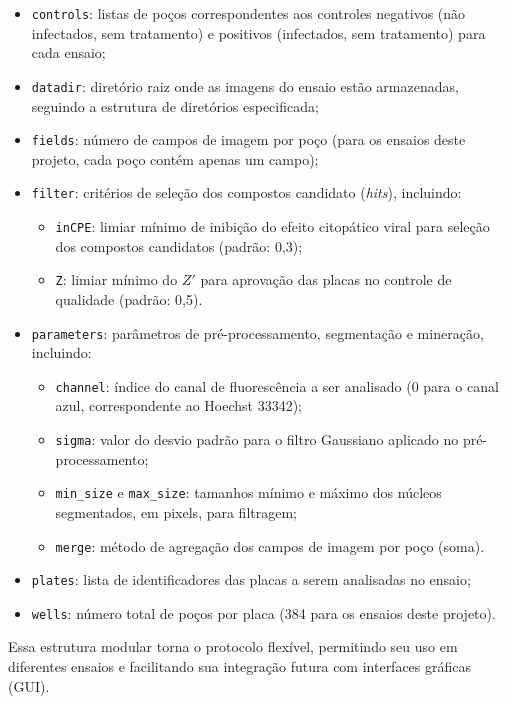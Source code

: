 \documentclass[12pt]{article}
\begin{document}
\begin{itemize}
  \item \texttt{controls}: listas de poços correspondentes aos controles negativos (não infectados, sem tratamento) e positivos (infectados, sem tratamento) para cada ensaio;
  \item \texttt{datadir}: diretório raiz onde as imagens do ensaio estão armazenadas, seguindo a estrutura de diretórios especificada;
  \item \texttt{fields}: número de campos de imagem por poço (para os ensaios deste projeto, cada poço contém apenas um campo);
  \item \texttt{filter}: critérios de seleção dos compostos candidato (\textit{hits}), incluindo:
  \begin{itemize}
    \item \texttt{inCPE}: limiar mínimo de inibição do efeito citopático viral para seleção dos compostos candidatos (padrão: 0,3);
    \item \texttt{Z}: limiar mínimo do $Z'$ para aprovação das placas no controle de qualidade (padrão: 0,5).
  \end{itemize}
  \item \texttt{parameters}: parâmetros de pré-processamento, segmentação e mineração, incluindo:
  \begin{itemize}
    \item \texttt{channel}: índice do canal de fluorescência a ser analisado (0 para o canal azul, correspondente ao Hoechst 33342);
    \item \texttt{sigma}: valor do desvio padrão para o filtro Gaussiano aplicado no pré-processamento;
    \item \texttt{min\_size} e \texttt{max\_size}: tamanhos mínimo e máximo dos núcleos segmentados, em pixels, para filtragem;
    \item \texttt{merge}: método de agregação dos campos de imagem por poço (soma).
  \end{itemize}
  \item \texttt{plates}: lista de identificadores das placas a serem analisadas no ensaio;
  \item \texttt{wells}: número total de poços por placa (384 para os ensaios deste projeto).
\end{itemize}

Essa estrutura modular torna o protocolo flexível, permitindo seu uso em diferentes ensaios e facilitando sua integração futura com interfaces gráficas (GUI).
\end{document}
